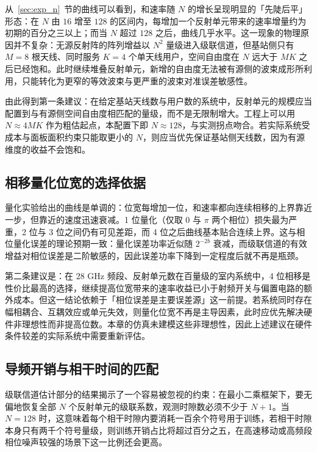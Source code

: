 从~\ref{sec:exp_n}~节的曲线可以看到，和速率随 $N$ 的增长呈现明显的「先陡后平」形态：在 $N$ 由 $16$ 增至 $128$ 的区间内，每增加一个反射单元带来的速率增量约为初期的百分之三以上；而当 $N$ 超过 $128$ 之后，曲线几乎水平。这一现象的物理原因并不复杂：无源反射阵的阵列增益以 $N^2$ 量级进入级联信道，但基站侧只有 $M=8$ 根天线、同时服务 $K=4$ 个单天线用户，空间自由度在 $N$ 远大于 $MK$ 之后已经饱和。此时继续堆叠反射单元，新增的自由度无法被有源侧的波束成形所利用，只能转化为更窄的等效波束与更严重的波束对准误差敏感性。

由此得到第一条建议：在给定基站天线数与用户数的系统中，反射单元的规模应当配置到与有源侧空间自由度相匹配的量级，而不是无限制增大。工程上可以用 $N \approx 4MK$ 作为粗估起点，本配置下即 $N\approx128$，与实测拐点吻合。若实际系统受成本与面板面积约束只能取更小的 $N$，则应当优先保证基站侧天线数，因为有源维度的收益不会饱和。

\subsection{相移量化位宽的选择依据}
\label{sec:guidance_bits}

量化实验给出的曲线是单调的：位宽每增加一位，和速率都向连续相移的上界靠近一步，但靠近的速度迅速衰减。1 位量化（仅取 $0$ 与 $\pi$ 两个相位）损失最为严重，2 位与 3 位之间仍有可见差距，而 4 位之后曲线基本贴合连续上界。这与相位量化误差的理论预期一致：量化误差功率近似随 $2^{-2b}$ 衰减，而级联信道的有效增益对相位误差是二阶敏感的，因此误差功率下降到一定程度后就不再是瓶颈。

第二条建议是：在 28 GHz 频段、反射单元数在百量级的室内系统中，4 位相移是性价比最高的选择，继续提高位宽带来的速率收益已小于射频开关与偏置电路的额外成本。但这一结论依赖于「相位误差是主要误差源」这一前提。若系统同时存在幅相耦合、互耦效应或单元失效，则量化位宽不再是主导因素，此时应优先解决硬件非理想性而非提高位数。本章的仿真未建模这些非理想性，因此上述建议在硬件条件较差的实际系统中需要重新评估。

\subsection{导频开销与相干时间的匹配}
\label{sec:guidance_pilot}

级联信道估计部分的结果揭示了一个容易被忽视的约束：在最小二乘框架下，要无偏地恢复全部 $N$ 个反射单元的级联系数，观测时隙数必须不少于 $N+1$。当 $N=128$ 时，这意味着每个相干时隙内要消耗一百余个符号用于训练，若相干时隙本身只有两千个符号量级，则训练开销占比将超过百分之五，在高速移动或高频段相位噪声较强的场景下这一比例还会更高。

